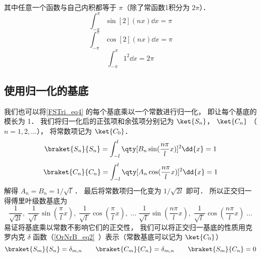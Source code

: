 其中任意一个函数与自己内积都等于 $\pi $（除了常函数1积分为 $2\pi$）．
\begin{equation}
\int_{-\pi}^\pi \sin[2](nx) \dd{x} = \pi
\end{equation}
\begin{equation}
\int_{-\pi}^\pi \cos[2](nx) \dd{x} = \pi
\end{equation}
\begin{equation}
\int_{-\pi}^\pi 1^2 \dd{x} = 2\pi
\end{equation}

\subsection{使用归一化的基底}

我们也可以将\autoref{FSTri_eq4} 的每个基底乘以一个常数进行归一化， 即让每个基底的模长为 1． 我们将归一化后的正弦项和余弦项分别记为 $\ket{S_n}$， $\ket{C_n}$ （$n = 1, 2,\dots$）， 将常数项记为 $\ket{C_0}$．
\begin{equation}
\braket{S_n}{S_n} = \int_{-l}^l \qty[B_n \sin(\frac{n\pi}{l}x)]^2 \dd{x} = 1
\end{equation}
\begin{equation}
\braket{C_n}{C_n} = \int_{-l}^l \qty[A_n \cos(\frac{n\pi}{l}x)]^2 \dd{x} = 1
\end{equation}
解得 $A_n = B_n = 1/\sqrt{l\ }$． 最后将常数项归一化变为 $1/\sqrt{2l}$ 即可． 所以正交归一得傅里叶级数基底为
\begin{equation}
\frac{1}{\sqrt{2l}},\;   \frac{1}{\sqrt{l\ }}\sin(\frac{\pi}{l} x),\;   \frac{1}{\sqrt{l\ }}\cos(\frac{\pi}{l} x),\;   \dots\;  \frac{1}{\sqrt{l\ }}\sin(\frac{n\pi}{l} x),\;   \frac{1}{\sqrt{l\ }}\cos(\frac{n\pi}{l} x)\;   \dots
\end{equation}
易证将基底乘以常数不影响它们的正交性， 我们可以将正交归一基底的性质用克罗内克 $\delta$ 函数（\autoref{OrNrB_eq2}~）表示（常数基底可以记为 $\ket{C_0}$）
\begin{equation}
\braket{S_m}{S_n} = \delta_{m,n}
\qquad
\braket{C_m}{C_n} = \delta_{m, n}
\qquad
\braket{S_m}{C_n} = 0
\end{equation}

